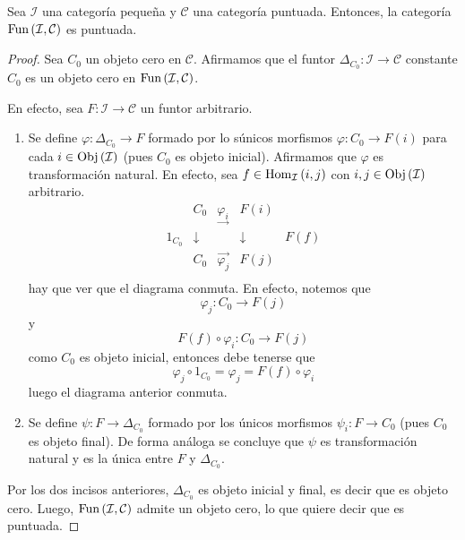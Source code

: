 \documentclass[12pt]{report}
\newcounter{it}
\theoremstyle{largebreak}
\newcommand\cf[3]{\ensuremath{#1:#2\rightarrow#3}}
\newcommand{\Obj}[1]{\ensuremath{\textup{Obj}\left(#1\right)}}
\newcommand{\Hom}[3]{\ensuremath{\textup{Hom}_{#1}\left(#2,#3\right)}}
\newcommand{\Fun}[2]{\ensuremath{\textup{Fun}\left(#1,#2\right)}}
\begin{document}
    \begin{propo}
        Sea $\mathcal{I}$ una categoría pequeña y $\mathcal{C}$ una categoría puntuada. Entonces, la categoría $\Fun{\mathcal{I}}{\mathcal{C}}$ es puntuada.
    \end{propo}

    \renewcommand{\theenumi}{\arabic{enumi}}

    \begin{proof}
        Sea $C_0$ un objeto cero en $\mathcal{C}$. Afirmamos que el funtor $\cf{\Delta_{C_0}}{\mathcal{I}}{\mathcal{C}}$ constante $C_0$ es un objeto cero en $\Fun{\mathcal{I}}{\mathcal{C}}$.

        En efecto, sea $\cf{F}{\mathcal{I}}{\mathcal{C}}$ un funtor arbitrario.
        \begin{enumerate}
            \item Se define $\cf{\varphi}{\Delta_{C_0}}{F}$ formado por lo súnicos morfismos $\cf{\varphi}{C_0}{F(i)}$ para cada $i\in\Obj{\mathcal{I}}$ (pues $C_0$ es objeto inicial). Afirmamos que $\varphi$ es transformación natural. En efecto, sea $f\in\Hom{\mathcal{I}}{i}{j}$ con $i,j\in\Obj{\mathcal{I}}$ arbitrario.
            \begin{equation*}
                \begin{array}{rcccl}
                    & C_0 & \underset{\longrightarrow}{\varphi_i} & F(i) &\\
                    1_{C_0} & \downarrow & & \downarrow & F(f) \\
                    & C_0 & \overset{\longrightarrow}{\varphi_j} & F(j) &\\
                \end{array}
            \end{equation*}
            hay que ver que el diagrama conmuta. En efecto, notemos que
            \begin{equation*}
                \cf{\varphi_j}{C_0}{F(j)}
            \end{equation*}
            y
            \begin{equation*}
                \cf{F(f)\circ\varphi_i}{C_0}{F(j)}
            \end{equation*}
            como $C_0$ es objeto inicial, entonces debe tenerse que
            \begin{equation*}
                \varphi_j\circ 1_{C_0}=\varphi_j=F(f)\circ\varphi_i
            \end{equation*}
            luego el diagrama anterior conmuta.

            \item Se define $\cf{\psi}{F}{\Delta_{C_0}}$ formado por los únicos morfismos $\cf{\psi_i}{F}{C_0}$ (pues $C_0$ es objeto final). De forma análoga se concluye que $\psi$ es transformación natural y es la única entre $F$ y $\Delta_{C_0}$.
        \end{enumerate}
        Por los dos incisos anteriores, $\Delta_{C_0}$ es objeto inicial y final, es decir que es objeto cero. Luego, $\Fun{\mathcal{I}}{\mathcal{C}}$ admite un objeto cero, lo que quiere decir que es puntuada.
    \end{proof}
\end{document}
